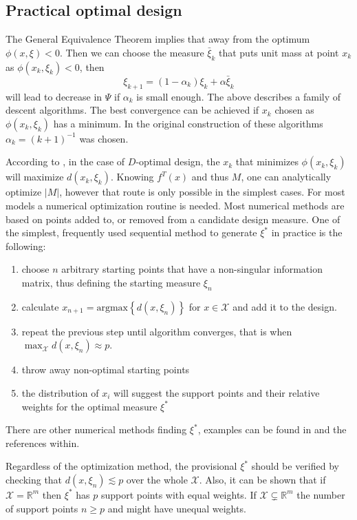\documentclass[12pt]{iopart}
\begin{document}
\subsection{Practical optimal design}
\label{sec:findoptimal}
The General Equivalence Theorem implies that away from the optimum $\phi(x, \xi) < 0$. Then we can choose the measure $\bar \xi_k$ that puts unit mass at point $x_k$ as $\phi(x_k, \xi_k) < 0$, then
\begin{equation}
\xi_{k+1} = (1-\alpha_k) \xi_k + \alpha \bar \xi_k
\end{equation}
will lead to decrease in $\Psi$ if $\alpha_k$ is small enough. The above describes a family of descent algorithms. The best convergence can be achieved if $x_k$ chosen as $\phi(x_k, \xi_k)$ has a minimum. In the original construction of these algorithms $\alpha_k = (k+1)^{-1}$ was chosen.

According to , in the case of $D$-optimal design, the $x_k$ that minimizes $\phi(x_k, \xi_k)$ will maximize $d(x_k, \xi_k)$. Knowing $f^T(x)$ and thus $M$, one can analytically optimize $|M|$, however that route is only possible in the simplest cases. For most models a numerical optimization routine is needed. Most numerical methods are based on points added to, or removed from a candidate design measure. One of the simplest, frequently used sequential method to generate $\xi^*$ in practice is the following:
\begin{enumerate}
\item choose $n$ arbitrary starting points that have a non-singular information matrix, thus defining the starting measure $\xi_n$
\item calculate $x_{n+1} = \mathrm{argmax}\left\{d(x, \xi_n)\right\}$ for $x \in \mathcal{X}$ and add it to the design.
\item repeat the previous step until algorithm converges, that is when $\max_{\mathcal{X}} d(x, \xi_{n}) \approx p$.
\item throw away non-optimal starting points
\item the distribution of $x_i$ will suggest the support points and their relative weights for the optimal measure $\xi^*$
\end{enumerate}
There are other numerical methods finding $\xi^*$, examples can be found in \cite{Atkinson1992,Silvey1980} and the references within.

Regardless of the optimization method, the provisional $\xi^*$ should be verified by checking that $d(x, \xi_{n}) \lesssim p$ over the whole $\mathcal{X}$. Also, it can be shown that if $\mathcal{X} = \mathbb{R}^m$ then $\xi^*$ has $p$ support points with equal weights. If $\mathcal{X} \subsetneq \mathbb{R}^m$ the number of support points $n \geq p$ and might have unequal weights.
\end{document}
